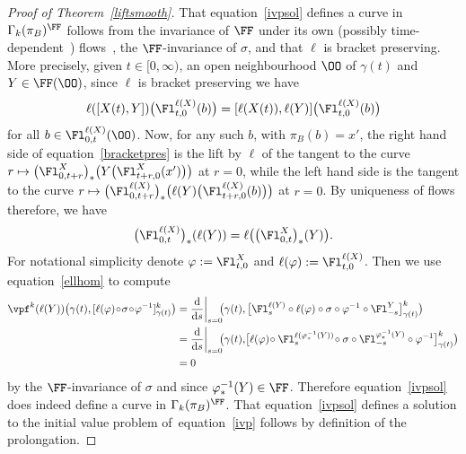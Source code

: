 \begin{proof}[Proof of Theorem~\ref{liftsmooth}]
That equation~\eqref{ivpsol} defines a curve in $\Gamma_{k}(\pi_{B})^{\FF}$ follows from the inva\-riance of $\FF$ under its own (possibly time-dependent~\cite[Lemma~3.3]{VilGar1}) flows~\cite[Proposition~1.6]{iakovos2}, the $\FF$-invariance of $\sigma$, and that $\ell$ is bracket preserving. More precisely, given $t\in[0,\infty)$, an open neighbourhood $\OO$ of $\gamma(t)$ and $Y\in\FF(\OO)$, since $\ell$ is bracket preserving we have
\begin{gather}\label{bracketpres}
\ell([X(t),Y])\big(\Fl^{\ell(X)}_{t,0}(b)\big) = [\ell(X(t)),\ell(Y)]\big(\Fl^{\ell(X)}_{t,0}(b)\big)
\end{gather}
for all $b\in\Fl^{\ell(X)}_{0,t}(\OO)$. Now, for any such $b$, with $\pi_{B}(b) = x'$, the right hand side of equation~\eqref{bracketpres} is the lift by $\ell$ of the tangent to the curve $r\mapsto\big(\Fl^{X}_{0,t+r}\big)_{*}\big(Y\big(\Fl_{t+r,0}^{X}(x')\big)\big)$ at $r = 0$,
while the left hand side is the tangent to the curve $r\mapsto \big(\Fl^{\ell(X)}_{0,t+r}\big)_{*}\big(\ell(Y)\big(\Fl^{\ell(X)}_{t+r,0}(b)\big)\big)$ at $r=0$. By uniqueness of flows therefore, we have
\begin{gather}\label{ellhom}
\big(\Fl^{\ell(X)}_{0,t}\big)_{*}(\ell(Y)) = \ell\big(\big(\Fl^{X}_{0,t}\big)_{*}(Y)\big).
\end{gather}
For notational simplicity denote $\varphi:=\Fl^{X}_{t,0}$ and $\ell(\varphi):=\Fl^{\ell(X)}_{t,0}$. Then we use equation~\eqref{ellhom} to compute
\begin{align*}
\vpf^{k}(\ell(Y))\big(\gamma(t),[\ell(\varphi)\!\circ\!\sigma\!\circ\!\varphi^{-1}]^{k}_{\gamma(t)}\big)
&= \frac{\rm d}{{\rm d}s}\bigg|_{s=0}\!\!\big(\gamma(t),\big[\Fl^{\ell(Y)}_{s}\circ\ell(\varphi) \circ\sigma\circ\varphi^{-1}\circ\Fl^{Y}_{-s}\big]^{k}_{\gamma(t)}\big)
\\
&= \frac{\rm d}{{\rm d}s}\bigg|_{s=0}\!\!\big(\gamma(t),\!\big[\ell(\varphi) \!\circ\Fl^{\ell(\varphi^{-1}_{*}(Y))}_{s}\! \circ\sigma\circ\Fl^{\varphi^{-1}_{*}(Y)}_{-s} \circ\varphi^{-1}\big]^{k}_{\gamma(t)}\big)
\\
&= 0
\end{align*}
by the $\FF$-invariance of $\sigma$ and since $\varphi^{-1}_{*}(Y)\in\FF$. Therefore equation~\eqref{ivpsol} does indeed define a curve in $\Gamma_{k}(\pi_{B})^{\FF}$. That equation~\eqref{ivpsol} defines a solution to the initial value problem of~equation~\eqref{ivp} follows by definition of the prolongation.


\end{proof}
